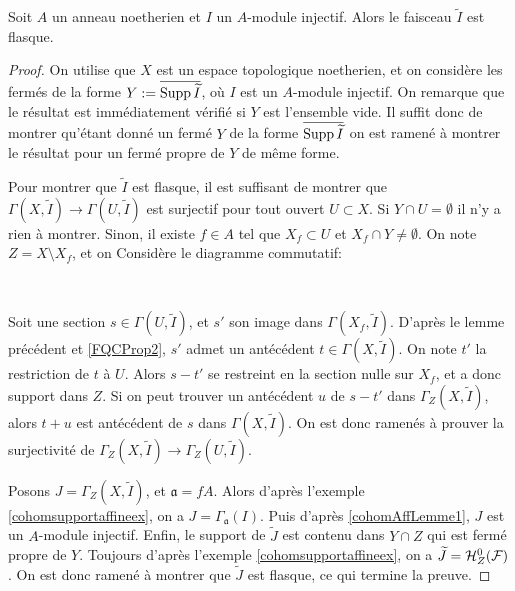 \begin{prop}\label{cohomAffProp1}
Soit $A$ un anneau noetherien et $I$ un $A$-module injectif. Alors le faisceau $\widetilde{I}$ est flasque.
\end{prop}
\begin{proof}
On utilise que $X$ est un espace topologique noetherien, et on considère les fermés de la forme $Y:=\overline{\operatorname{Supp} \widetilde{I}}$, où $I$ est un $A$-module injectif. On remarque que le résultat est immédiatement vérifié si $Y$ est l'ensemble vide. Il suffit donc de montrer qu'étant donné un fermé $Y$ de la forme $\overline{\operatorname{Supp} \widetilde{I}}$ on est ramené à montrer le résultat pour un fermé propre de $Y$ de même forme.

Pour montrer que $\widetilde{I}$ est flasque, il est suffisant de montrer que $\Gamma(X,\widetilde{I})\rightarrow\Gamma(U,\widetilde{I})$ est surjectif pour tout ouvert $U\subset X$. Si $Y\cap U=\emptyset$ il n'y a rien à montrer. Sinon, il existe $f\in A$ tel que $X_f\subset U$ et $X_f\cap Y\neq \emptyset$. On note $Z= X\setminus X_f$, et on Considère le diagramme commutatif:

	\begin{center}
	\\
	\end{center}
Soit une section $s\in\Gamma(U,\widetilde{I})$, et $s'$ son image dans $\Gamma(X_f,\widetilde{I})$. D'après le lemme précédent et \ref{FQCProp2}, $s'$ admet un antécédent $t\in \Gamma(X,\widetilde{I})$. On note $t'$ la restriction de $t$ à $U$. Alors $s-t'$ se restreint en la section nulle sur $X_f$, et a donc support dans $Z$. Si on peut trouver un antécédent $u$ de $s-t'$ dans $\Gamma_Z(X,\widetilde{I})$, alors $t+u$ est antécédent de $s$ dans $\Gamma(X,\widetilde{I})$. On est donc ramenés à prouver la surjectivité de $\Gamma_Z(X,\widetilde{I})\rightarrow\Gamma_Z(U,\widetilde{I})$.

Posons $J=\Gamma_Z(X,\widetilde{I})$, et $\mathfrak{a}=fA$. Alors d'après l'exemple \ref{cohomsupportaffineex}, on a $J=\Gamma_\mathfrak{a}(I)$. Puis d'après \ref{cohomAffLemme1}, $J$ est un $A$-module injectif. Enfin, le support de $\widetilde{J}$ est contenu dans $Y\cap Z$ qui est fermé propre de $Y$.  Toujours d'après l'exemple \ref{cohomsupportaffineex}, on a $\widetilde{J} = \mathcal{H} ^0 _Z(\mathcal{F})$. On est donc ramené à montrer que $\widetilde{J}$ est flasque, ce qui termine la preuve.
\end{proof}


